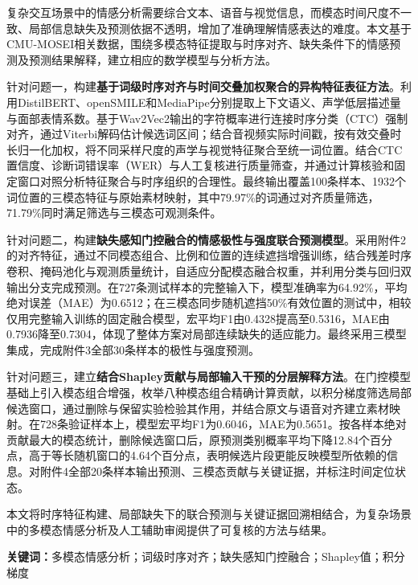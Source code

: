
复杂交互场景中的情感分析需要综合文本、语音与视觉信息，而模态时间尺度不一致、局部信息缺失及预测依据不透明，增加了准确理解情感表达的难度。本文基于CMU-MOSEI相关数据，围绕多模态特征提取与时序对齐、缺失条件下的情感预测及预测结果解释，建立相应的数学模型与分析方法。

针对问题一，构建\textbf{基于词级时序对齐与时间交叠加权聚合的异构特征表征方法}。利用DistilBERT、openSMILE和MediaPipe分别提取上下文语义、声学低层描述量与面部表情系数。基于Wav2Vec2输出的字符概率进行连接时序分类（CTC）强制对齐，通过Viterbi解码估计候选词区间；结合音视频实际时间戳，按有效交叠时长归一化加权，将不同采样尺度的声学与视觉特征聚合至统一词位置。结合CTC置信度、诊断词错误率（WER）与人工复核进行质量筛查，并通过计算核验和固定窗口对照分析特征聚合与时序组织的合理性。最终输出覆盖100条样本、1932个词位置的三模态特征与原始素材映射，其中79.97\%的词通过对齐质量筛选，71.79\%同时满足筛选与三模态可观测条件。

针对问题二，构建\textbf{缺失感知门控融合的情感极性与强度联合预测模型}。采用附件2的对齐特征，通过不同模态组合、比例和位置的连续遮挡增强训练，结合残差时序卷积、掩码池化与观测质量统计，自适应分配模态融合权重，并利用分类与回归双输出分支完成预测。在727条测试样本的完整输入下，模型准确率为64.92\%，平均绝对误差（MAE）为0.6512；在三模态同步随机遮挡50\%有效位置的测试中，相较仅用完整输入训练的固定融合模型，宏平均F1由0.4328提高至0.5316，MAE由0.7936降至0.7304，体现了整体方案对局部连续缺失的适应能力。最终采用三模型集成，完成附件3全部30条样本的极性与强度预测。

针对问题三，建立\textbf{结合Shapley贡献与局部输入干预的分层解释方法}。在门控模型基础上引入模态组合增强，枚举八种模态组合精确计算贡献，以积分梯度筛选局部候选窗口，通过删除与保留实验检验其作用，并结合原文与语音对齐建立素材映射。在728条验证样本上，模型宏平均F1为0.6046，MAE为0.5651。按各样本绝对贡献最大的模态统计，删除候选窗口后，原预测类别概率平均下降12.84个百分点，高于等长随机窗口的4.64个百分点，表明候选片段更能反映模型所依赖的信息。对附件4全部20条样本输出预测、三模态贡献与关键证据，并标注时间定位状态。

本文将时序特征构建、局部缺失下的联合预测与关键证据回溯相结合，为复杂场景中的多模态情感分析及人工辅助审阅提供了可复核的方法与结果。

\par\noindent\textbf{关键词：}多模态情感分析；词级时序对齐；缺失感知门控融合；Shapley值；积分梯度
